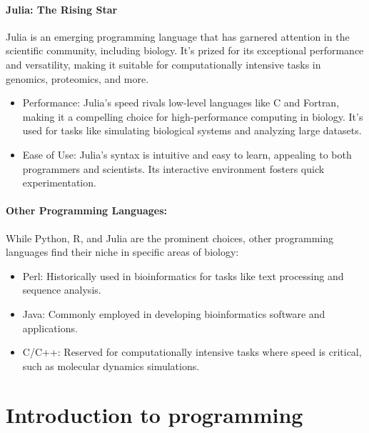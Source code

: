 \documentclass[
]{book}
\begin{document}
\hypertarget{julia-the-rising-star}{%
\subsubsection{Julia: The Rising Star}\label{julia-the-rising-star}}

Julia is an emerging programming language that has garnered attention in the scientific community, including biology. It's prized for its exceptional performance and versatility, making it suitable for computationally intensive tasks in genomics, proteomics, and more.

\begin{itemize}
\item
  Performance: Julia's speed rivals low-level languages like C and Fortran, making it a compelling choice for high-performance computing in biology. It's used for tasks like simulating biological systems and analyzing large datasets.
\item
  Ease of Use: Julia's syntax is intuitive and easy to learn, appealing to both programmers and scientists. Its interactive environment fosters quick experimentation.
\end{itemize}

\hypertarget{other-programming-languages}{%
\subsubsection{Other Programming Languages:}\label{other-programming-languages}}

While Python, R, and Julia are the prominent choices, other programming languages find their niche in specific areas of biology:

\begin{itemize}
\item
  Perl: Historically used in bioinformatics for tasks like text processing and sequence analysis.
\item
  Java: Commonly employed in developing bioinformatics software and applications.
\item
  C/C++: Reserved for computationally intensive tasks where speed is critical, such as molecular dynamics simulations.
\end{itemize}

\hypertarget{introduction-to-programming}{%
\chapter{Introduction to programming}\label{introduction-to-programming}}
\end{document}
